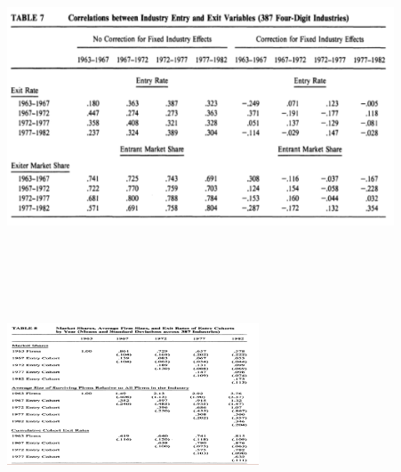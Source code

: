 \documentclass[dvipdfmx,12pt]{beamer}
\begin{document}
\begin{frame}

\begin{center}

\includegraphics[width=11.5cm,height=7.5cm]{DRS_T7.pdf}

\end{center}

\end{frame}

\begin{frame}

\begin{center}

\includegraphics[width=7.5cm,height=8cm]{DRS_T8.pdf}

\end{center}

\end{frame}
\end{document}
